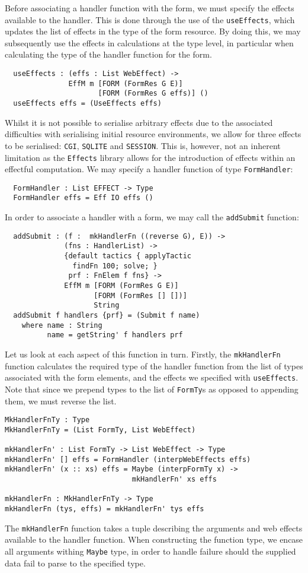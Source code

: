 \documentclass[preprint]{sigplanconf}
\begin{document}
Before associating a handler function with the form, we must specify the effects available to the handler. This is done through the use of the \texttt{useEffects}, which updates the list of effects in the type of the form resource. By doing this, we may subsequently use the effects in calculations at the type level, in particular when calculating the type of the handler function for the form. 
{\small
\begin{verbatim}
  useEffects : (effs : List WebEffect) ->
               EffM m [FORM (FormRes G E)] 
                      [FORM (FormRes G effs)] ()
  useEffects effs = (UseEffects effs)
\end{verbatim}}
Whilst it is not possible to serialise arbitrary effects due to the associated difficulties with serialising initial resource environments, we allow for three effects to be serialised: \texttt{CGI}, \texttt{SQLITE} and \texttt{SESSION}. This is, however, not an inherent limitation as the \texttt{Effects} library allows for the introduction of effects within an effectful computation.
%
We may specify a handler function of type \texttt{FormHandler}:
{\small
\begin{verbatim}
  FormHandler : List EFFECT -> Type
  FormHandler effs = Eff IO effs ()
\end{verbatim}
}
In order to associate a handler with a form, we may call the \texttt{addSubmit} function:
{\small
\begin{verbatim}
  addSubmit : (f :  mkHandlerFn ((reverse G), E)) ->
              (fns : HandlerList) ->
              {default tactics { applyTactic 
                findFn 100; solve; }
               prf : FnElem f fns} ->
              EffM m [FORM (FormRes G E)]
                     [FORM (FormRes [] [])] 
                     String
  addSubmit f handlers {prf} = (Submit f name)
    where name : String
          name = getString' f handlers prf          
\end{verbatim}
}
Let us look at each aspect of this function in turn. Firstly, the \texttt{mkHandlerFn} function calculates the required type of the handler function from the list of types associated with the form elements, and the effects we specified with \texttt{useEffects}. Note that since we prepend types to the list of \texttt{FormTy}s as opposed to appending them, we must reverse the list.
{\small
\begin{verbatim}
MkHandlerFnTy : Type
MkHandlerFnTy = (List FormTy, List WebEffect)

mkHandlerFn' : List FormTy -> List WebEffect -> Type
mkHandlerFn' [] effs = FormHandler (interpWebEffects effs) 
mkHandlerFn' (x :: xs) effs = Maybe (interpFormTy x) -> 
                              mkHandlerFn' xs effs 

mkHandlerFn : MkHandlerFnTy -> Type 
mkHandlerFn (tys, effs) = mkHandlerFn' tys effs 
\end{verbatim}
}
The \texttt{mkHandlerFn} function takes a tuple describing the arguments and web effects available to the handler function. When constructing the function type, we encase all arguments withing \texttt{Maybe} type, in order to handle failure should the supplied data fail to parse to the specified type.
\end{document}
